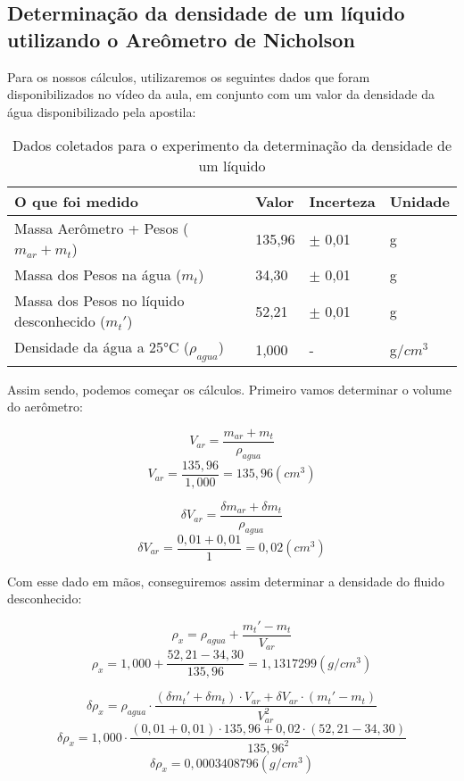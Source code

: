 \subsection{Determinação da densidade de um líquido utilizando o
Areômetro de Nicholson}

Para os nossos cálculos, utilizaremos os seguintes dados que foram disponibilizados no vídeo da aula, em conjunto com um valor da densidade da água disponibilizado pela apostila:

\begin{table}[H]
    \centering
    \begin{tabular}{ |M{5cm}||M{2cm}||M{2cm}||M{2cm}|  }
        \hline
        \textbf{O que foi medido} & \textbf{Valor} & \textbf{Incerteza} & \textbf{Unidade}\\
        \hline
        Massa Aerômetro + Pesos ($m_{ar} + m_t$)         & 135,96    & $\pm$ 0,01 & g\\
        Massa dos Pesos na água ($m_t$)                     & 34,30     & $\pm$ 0,01 & g\\
        Massa dos Pesos no líquido desconhecido ($m_t'$)    & 52,21     & $\pm$ 0,01 & g\\
        \hline
        Densidade da água a 25°C ($\rho _{agua}$)           & 1,000 & - & g/$cm^3$\\
        \hline
    \end{tabular}
    \caption{Dados coletados para o experimento da determinação da densidade de um líquido}
\end{table}

Assim sendo, podemos começar os cálculos. Primeiro vamos determinar o volume do aerômetro:

\[ V_{ar} = \frac{m_{ar} + m_t}{\rho _{agua}} \]
\[ V_{ar} = \frac{135,96}{1,000} = 135,96 (cm^3) \]

\[ \delta V_{ar} = \frac{\delta m_{ar} + \delta m_t}{\rho _{agua}} \]
\[ \delta V_{ar} = \frac{0,01 + 0,01}{1} = 0,02 (cm^3) \]

Com esse dado em mãos, conseguiremos assim determinar a densidade do fluido desconhecido:

\[ \rho _x = \rho _{agua} + \frac{m_t' - m_t}{V_{ar}} \]
\[ \rho _x = 1,000 + \frac{52,21 - 34,30}{135,96} = 1,1317299 (g/cm^3) \]

\[ \delta \rho _x = \rho _{agua} \cdot \frac{(\delta m_t' + \delta m_t) \cdot V_{ar} + \delta V_{ar} \cdot (m_t' - m_t)}{V_{ar}^2} \]
\[ \delta \rho _x = 1,000 \cdot \frac{(0,01 + 0,01) \cdot 135,96 + 0,02 \cdot (52,21 - 34,30)}{135,96^2} \]
\[ \delta \rho _x = 0,0003408796 (g/cm^3) \]

